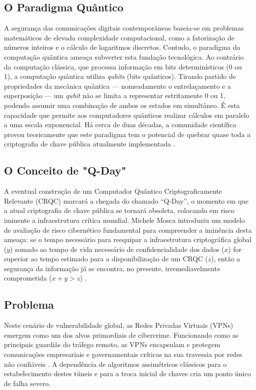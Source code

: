 \documentclass[runningheads]{llncs}
\begin{document}
\subsection{O Paradigma Quântico}
A segurança das comunicações digitais contemporâneas baseia-se em problemas matemáticos de elevada complexidade computacional, como a fatorização de números inteiros e o cálculo de logaritmos discretos. 
Contudo, o paradigma da computação quântica ameaça subverter esta fundação tecnológica. 
Ao contrário da computação clássica, que processa informação em bits determinísticos (0 ou 1), a computação quântica utiliza \textit{qubits} (bits quânticos). Tirando partido de propriedades da mecânica quântica — nomeadamente o entrelaçamento e a superposição — um \textit{qubit} não se limita a representar estritamente 0 ou 1, podendo assumir uma combinação de ambos os estados em simultâneo. É esta capacidade que permite aos computadores quânticos realizar cálculos em paralelo a uma escala exponencial.
Há cerca de duas décadas, a comunidade científica provou teoricamente que este paradigma tem o potencial de quebrar quase toda a criptografia de chave pública atualmente implementada \cite{article}.

\subsection{O Conceito de "Q-Day"}
A eventual construção de um Computador Quântico Criptograficamente Relevante (CRQC) marcará a chegada do chamado ``Q-Day'', o momento em que a atual criptografia de chave pública se tornará obsoleta, colocando em risco iminente a infraestrutura crítica mundial. Michele Mosca introduziu um modelo de avaliação de risco cibernético fundamental para compreender a iminência desta ameaça: se o tempo necessário para reequipar a infraestrutura criptográfica global ($y$) somado ao tempo de vida necessário de confidencialidade dos dados ($x$) for superior ao tempo estimado para a disponibilização de um CRQC ($z$), então a segurança da informação já se encontra, no presente, irremediavelmente comprometida ($x + y > z$) \cite{article}.

\subsection{Problema}
Neste cenário de vulnerabilidade global, as Redes Privadas Virtuais (VPNs) emergem como um dos alvos primordiais de cibercrime. Funcionando como as principais guardiãs do tráfego remoto, as VPNs encapsulam e protegem comunicações empresariais e governamentais críticas na sua travessia por redes não confiáveis \cite{10827179}. A dependência de algoritmos assimétricos clássicos para o estabelecimento destes túneis e para a troca inicial de chaves cria um ponto único de falha severo.
\end{document}
